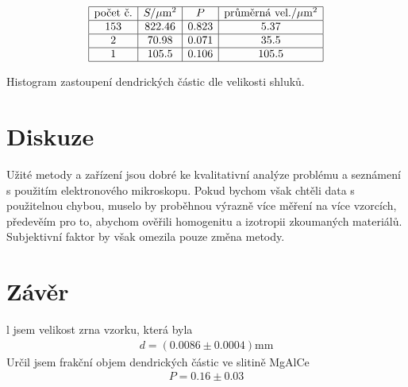 \documentclass[a4paper,12pt]{article}
\begin{document}
\begin{table}
$$
\begin{array}{|c|c|c|c|}
\hline
\mbox{počet č.}&    S/\mu\mbox{m}^2& P& \mbox{průměrná vel.}/\mu\mbox{m}^2 \\ \hline
153&    822.46& 0.823&  5.37 \\ \hline
2&  70.98&  0.071&  35.5 \\ \hline
1&  105.5&  0.106&  105.5 \\ \hline
\end{array}
$$
\caption{Histogram zastoupení dendrických částic dle velikosti shluků.}
\label{his}
\end{table}

\section{Diskuze}
Užité metody a zařízení jsou dobré ke kvalitativní analýze problému a seznámení s použitím elektronového mikroskopu. Pokud bychom však chtěli data s použitelnou chybou, muselo by proběhnou výrazně více měření na více vzorcích, předevěím 
pro to, abychom ověřili homogenitu a izotropii zkoumaných materiálů. Subjektivní faktor by však omezila pouze změna metody.

\section{Závěr}
l jsem velikost zrna vzorku, která byla
\begin{eqnarray}
d=(0.0086 \pm 0.0004) \mbox{mm}
\end{eqnarray}
Určil jsem frakční objem dendrických částic ve slitině MgAlCe
\begin{eqnarray}
P=0.16\pm0.03
\end{eqnarray}
\end{document}
